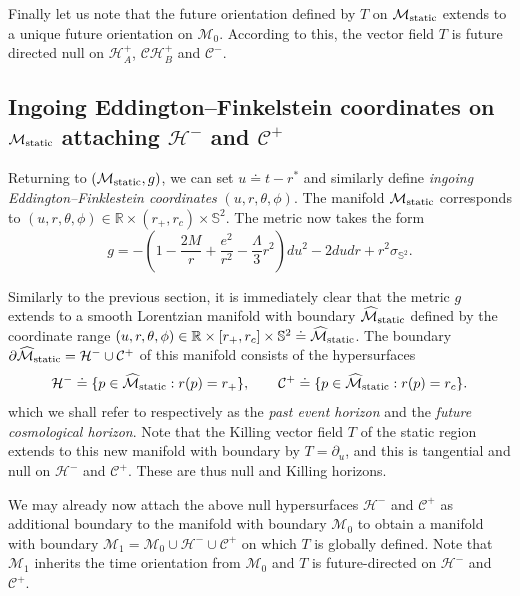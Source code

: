\documentclass[A4,10pt]{article}
\begin{document}
Finally let us note that the future orientation defined by $T$ 
on $\mathcal{M}_{\rm static}$ extends
to a unique future orientation on $\mathcal{M}_0$. According to this,
the vector field $T$ is future directed null on $\mathcal{H}^+_A$, $\mathcal{CH}^+_B$
and $\mathcal{C}^-$.

\subsection{Ingoing Eddington--Finkelstein coordinates on $\mathcal{M}_{\rm static}$  attaching $\mathcal{H}^-$ and $\mathcal{C}^+$}
\label{ingoingfir}

Returning to $\left(\mathcal{M}_{{\rm static}},g\right)$, we can set $u \doteq t- r^*$ and similarly define \emph{ingoing Eddington--Finklestein coordinates} $(u,r,\theta,\phi)$. The manifold $\mathcal{M}_{{\rm static}}$ corresponds to $(u,r,\theta,\phi) \in \mathbb{R} \times (r_+,r_c)\times \mathbb{S}^2$. The metric now takes the form
\begin{equation}\label{metricingoing}
g = -\left(1 - \frac{2M}{r} +\frac{e^2}{r^2} - \frac{\Lambda}{3}r^2\right)du^2 - 2dudr + r^2\sigma_{\mathbb{S}^2}.
\end{equation}


Similarly to the previous section, it is immediately clear that the metric $g$ extends to a smooth Lorentzian manifold with boundary $\widehat{\mathcal{M}}_{\rm static}$
defined by the coordinate range 
$(u,r,\theta,\phi) \in \mathbb{R} \times [r_+,r_c] \times \mathbb{S}^2\doteq
\widehat{\mathcal{M}}_{\rm static}$. 
The boundary $\partial \widehat{\mathcal{M}}_{\rm static}=\mathcal{H}^-\cup \mathcal{C}^+$ 
of this manifold consists of the hypersurfaces 
\[
\mathcal{H}^- \doteq \{p\in \widehat{\mathcal{M}}_{\rm static}:
r(p)=r_+\}, \qquad \mathcal{C}^+ \doteq \{p\in \widehat{\mathcal{M}}_{\rm static}: r(p) = r_c\}.
\]
which we shall refer to respectively as the \emph{past event horizon} and
the \emph{future cosmological horizon}.
Note that the Killing vector field $T$ of the static region extends 
to this new manifold with boundary by $T=\partial_u$, and this is tangential
and null on $\mathcal{H}^-$ and $\mathcal{C}^+$. These are thus null and
Killing horizons.

We may already now attach the above null hypersurfaces
$\mathcal{H}^-$ and $\mathcal{C}^+$ as
additional boundary to the manifold with boundary $\mathcal{M}_0$
to obtain 
a manifold with boundary
$\mathcal{M}_1=\mathcal{M}_0\cup \mathcal{H}^-\cup\mathcal{C}^+$
on which $T$ is globally defined.
Note that $\mathcal{M}_1$
inherits the time orientation from $\mathcal{M}_0$
and $T$ is future-directed on $\mathcal{H}^-$ and $\mathcal{C}^+$.
\end{document}
